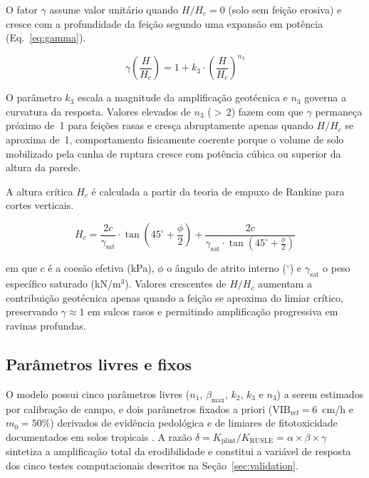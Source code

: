 \documentclass[preprint,review,12pt,authoryear]{elsarticle}
\begin{document}
O fator $\gamma$ assume valor unitário quando $H/H_c = 0$ (solo sem feição erosiva) e cresce com a profundidade da feição segundo uma expansão em potência (Eq.~\ref{eq:gamma}).

\begin{equation}
\gamma\!\left(\frac{H}{H_c}\right) = 1 + k_3 \cdot \left(\frac{H}{H_c}\right)^{n_3}
\label{eq:gamma}
\end{equation}

O parâmetro $k_3$ escala a magnitude da amplificação geotécnica e $n_3$ governa a curvatura da resposta. Valores elevados de $n_3$ ($>$\,2) fazem com que $\gamma$ permaneça próximo de~1 para feições rasas e cresça abruptamente apenas quando $H/H_c$ se aproxima de~1, comportamento fisicamente coerente porque o volume de solo mobilizado pela cunha de ruptura cresce com potência cúbica ou superior da altura da parede.

A altura crítica $H_c$ é calculada a partir da teoria de empuxo de Rankine para cortes verticais.

\begin{equation}
H_c = \frac{2c}{\gamma_{\mathrm{sat}}} \cdot \tan\!\left(45^\circ + \frac{\phi}{2}\right) + \frac{2c}{\gamma_{\mathrm{sat}} \cdot \tan\!\left(45^\circ + \frac{\phi}{2}\right)}
\label{eq:hc}
\end{equation}

\noindent em que $c$ é a coesão efetiva (kPa), $\phi$ o ângulo de atrito interno ($^\circ$) e $\gamma_{\mathrm{sat}}$ o peso específico saturado (kN/m$^3$). Valores crescentes de $H/H_c$ aumentam a contribuição geotécnica apenas quando a feição se aproxima do limiar crítico, preservando $\gamma \approx 1$ em sulcos rasos e permitindo amplificação progressiva em ravinas profundas.

\subsection{Parâmetros livres e fixos}

O modelo possui cinco parâmetros livres ($n_1$, $\beta_{\max}$, $k_2$, $k_3$ e $n_3$) a serem estimados por calibração de campo, e dois parâmetros fixados a priori ($\mathrm{VIB_{ref}} = 6$~cm/h e $m_0 = 50\%$) derivados de evidência pedológica e de limiares de fitotoxicidade documentados em solos tropicais \citep{embrapa_2018}. A razão $\delta = K_{\mathrm{plint}} / K_{\mathrm{RUSLE}} = \alpha \times \beta \times \gamma$ sintetiza a amplificação total da erodibilidade e constitui a variável de resposta dos cinco testes computacionais descritos na Seção~\ref{sec:validation}.
\end{document}
